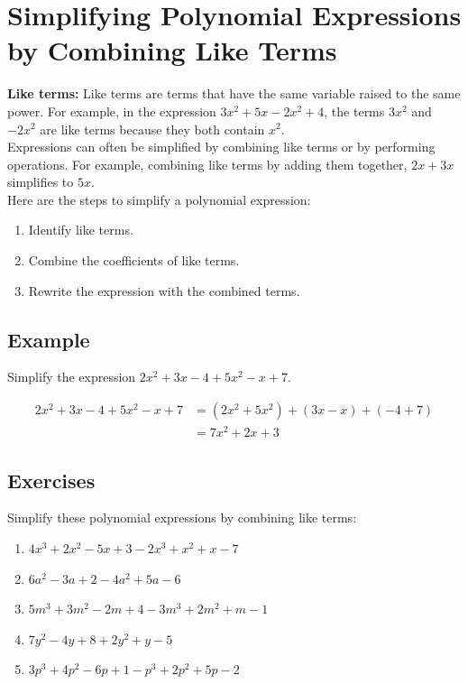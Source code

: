 \documentclass[12pt]{article}
\begin{document}
\section*{Simplifying Polynomial Expressions\\by Combining Like Terms}

\textbf{Like terms:} Like terms are terms that have the same variable raised to the same power. For example, in the expression $3x^2 + 5x - 2x^2 + 4$, the terms $3x^2$ and $-2x^2$ are like terms because they both contain $x^2$.\\

Expressions can often be simplified by combining like terms or by performing
operations. For example, combining like terms by adding them together,
$2x + 3x$ simplifies to $5x$.\\

Here are the steps to simplify a polynomial expression:
\begin{enumerate}
\item Identify like terms.
\item Combine the coefficients of like terms.
\item Rewrite the expression with the combined terms.
\end{enumerate}

\subsection*{Example}

Simplify the expression $2x^2 + 3x - 4 + 5x^2 - x + 7$.

\begin{align*}
2x^2 + 3x - 4 + 5x^2 - x + 7 & = (2x^2 + 5x^2) + (3x - x) + (-4 + 7) \\
& = 7x^2 + 2x + 3
\end{align*}

\subsection*{Exercises}

Simplify these polynomial expressions by combining like terms:

\begin{enumerate}
    \item $4x^3 + 2x^2 - 5x + 3 - 2x^3 + x^2 + x - 7$
    \item $6a^2 - 3a + 2 - 4a^2 + 5a - 6$
    \item $5m^3 + 3m^2 - 2m + 4 - 3m^3 + 2m^2 + m - 1$
    \item $7y^2 - 4y + 8 + 2y^2 + y - 5$
    \item $3p^3 + 4p^2 - 6p + 1 - p^3 + 2p^2 + 5p - 2$
\end{enumerate}
\end{document}
